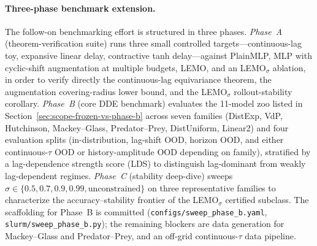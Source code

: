 \paragraph{Three-phase benchmark extension.}
The follow-on benchmarking effort is structured in three phases.
\emph{Phase~A} (theorem-verification suite) runs three small controlled
targets---continuous-lag toy, expansive linear delay, contractive
tanh delay---against PlainMLP, MLP with cyclic-shift augmentation at
multiple budgets, LEMO, and an LEMO$_{\sigma}$ ablation, in order to
verify directly the continuous-lag equivariance theorem, the
augmentation covering-radius lower bound, and the LEMO$_{\sigma}$
rollout-stability corollary.  \emph{Phase~B} (core DDE benchmark)
evaluates the 11-model zoo listed in Section~\ref{sec:scope-frozen-vs-phase-b}
across seven families (DistExp, VdP, Hutchinson, Mackey--Glass,
Predator--Prey, DistUniform, Linear2) and four evaluation splits
(in-distribution, lag-shift OOD, horizon OOD, and either
continuous-$\tau$ OOD or history-amplitude OOD depending on family),
stratified by a lag-dependence strength score (LDS) to distinguish
lag-dominant from weakly lag-dependent regimes.  \emph{Phase~C}
(stability deep-dive) sweeps $\sigma \in \{0.5, 0.7, 0.9, 0.99, \text{unconstrained}\}$
on three representative families to characterize the
accuracy--stability frontier of the LEMO$_{\sigma}$ certified subclass.
The scaffolding for Phase~B is committed
(\texttt{configs/sweep\_phase\_b.yaml},
\texttt{slurm/sweep\_phase\_b.py}); the remaining blockers are
data generation for Mackey--Glass and Predator--Prey, and an
off-grid continuous-$\tau$ data pipeline.
